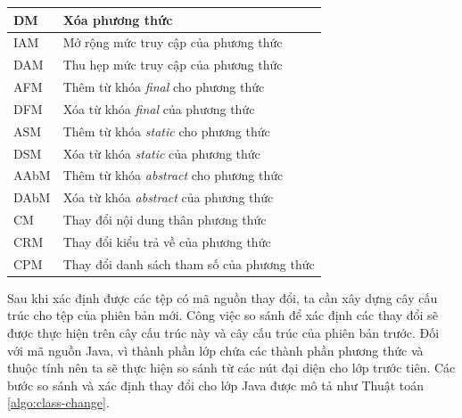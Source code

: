 \documentclass[12pt]{report}
\begin{document}
\begin{table}[!htb]
\begin{minipage}{.5\linewidth}
\begin{tabular}{|p{1.3cm}|p{7cm}|}
			DM               & Xóa phương thức                                                 \\ \hline
			IAM              & Mở rộng mức truy cập của phương thức                            \\ \hline
			DAM              & Thu hẹp mức truy cập của phương thức                            \\ \hline
			AFM              & Thêm từ khóa \textit{final} cho phương thức    \\ \hline
			DFM              & Xóa từ khóa \textit{final} của phương thức     \\ \hline
			ASM              & Thêm từ khóa \textit{static} cho phương thức   \\ \hline
			DSM              & Xóa từ khóa \textit{static} của phương thức    \\ \hline
			AAbM             & Thêm từ khóa \textit{abstract} cho phương thức \\ \hline
			DAbM             & Xóa từ khóa \textit{abstract} của phương thức  \\ \hline
			CM             & Thay đổi nội dung thân phương thức  \\ \hline
			CRM             & Thay đổi kiểu trả về của phương thức  \\ \hline
			CPM             & Thay đổi danh sách tham số của phương thức  \\ \hline
		\end{tabular}
	\end{minipage} 
\end{table}

Sau khi xác định được các tệp có mã nguồn thay đổi, ta cần xây dựng cây cấu trúc cho tệp của phiên bản mới. Công việc so sánh để xác định các thay đổi sẽ được thực hiện trên cây cấu trúc này và cây cấu trúc của phiên bản trước. Đối với mã nguồn Java, vì thành phần lớp chứa các thành phần phương thức và thuộc tính nên ta sẽ thực hiện so sánh từ các nút đại diện cho lớp trước tiên. Các bước so sánh và xác định thay đổi cho lớp Java được mô tả như Thuật toán \ref{algo:class-change}.
\end{document}
